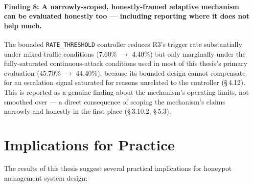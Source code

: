 \paragraph{Finding 8: A narrowly-scoped, honestly-framed adaptive mechanism can be evaluated honestly too --- including reporting where it does not help much.}
The bounded \texttt{RATE\_THRESHOLD} controller reduces R3's trigger rate
substantially under mixed-traffic conditions (7.60\% $\to$ 4.40\%) but only
marginally under the fully-saturated continuous-attack conditions used in
most of this thesis's primary evaluation (45.70\% $\to$ 44.40\%), because its
bounded design cannot compensate for an escalation signal saturated for
reasons unrelated to the controller (\S\,4.12).
This is reported as a genuine finding about the mechanism's operating limits,
not smoothed over --- a direct consequence of scoping the mechanism's claims
narrowly and honestly in the first place (\S\,3.10.2, \S\,5.3).

\section{Implications for Practice}

The results of this thesis suggest several practical implications for
honeypot management system design:

